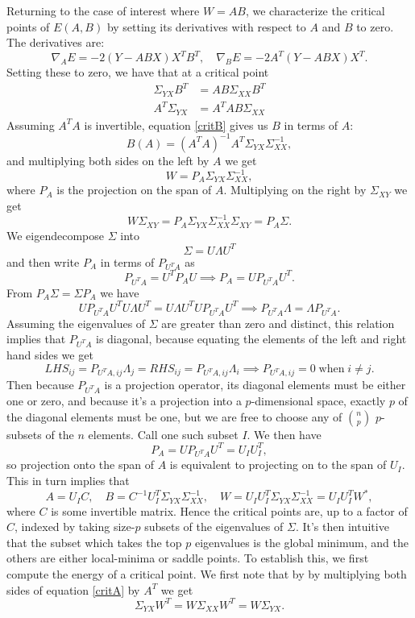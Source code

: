 \documentclass[11pt]{article}
\begin{document}
Returning to the case of interest where $W = AB$, we characterize the critical points of $E(A,B)$ by setting its derivatives with respect to $A$ and $B$ to zero. The derivatives are:
$$ \nabla_A E = -2 (Y - ABX)X^T B^T, \quad \nabla_B E = -2A^T(Y - ABX)X^T.$$
Setting these to zero, we have that at a critical point
\begin{align}
  \label{critA}
  \Sigma_{YX}B^T &= AB \Sigma_{XX}B^T \\
  \label{critB}
  A^T \Sigma_{YX} &= A^T A B \Sigma_{XX}
\end{align}
Assuming $A^TA$ is invertible, equation \ref{critB} gives us $B$ in terms of $A$:
$$ B(A) = (A^TA)^{-1}A^T \Sigma_{YX}\Sigma_{XX}^{-1},$$
and multiplying both sides on the left by $A$ we get
$$ W = P_A \Sigma_{YX}\Sigma_{XX}^{-1},$$
where $P_A$ is the projection on the span of $A$. Multiplying on the right by $\Sigma_{XY}$ we get
$$ W\Sigma_{XY} = P_A \Sigma_{YX}\Sigma_{XX}^{-1}\Sigma_{XY} = P_A \Sigma.$$
We eigendecompose $\Sigma$ into
$$ \Sigma = U \Lambda U^T $$
and then write $P_A$ in terms of $P_{U^T A}$ as
$$ P_{U^TA} = U^T P_A U \implies P_A = U P_{U^T A} U^T.$$
From $P_A \Sigma = \Sigma P_A$ we have
$$ U P_{U^T A} U^T U \Lambda U^T = U \Lambda U^TU P_{U^T A} U^T \implies P_{U^TA} \Lambda = \Lambda P_{U^TA}.$$
Assuming the eigenvalues of $\Sigma$ are greater than zero and distinct, this relation implies that $P_{U^T A}$ is diagonal, because equating the elements of the left and right hand sides we get
$$ LHS_{ij} =  P_{U^T A,ij} \Lambda_j = RHS_{ij} =  P_{U^T A,ij} \Lambda_i \implies P_{U^T A,ij} = 0\; \text{when} \; i \neq j.$$
Then because $P_{U^TA}$ is a projection operator, its diagonal elements must be either one or zero, and because it's a projection into a $p$-dimensional space, exactly $p$ of the diagonal elements must be one, but we are free to choose any of  ${n \choose p}$ $p$-subsets of the $n$ elements. Call one such subset $I$. We then have
$$ P_A = U P_{U^TA} U^T = U_I U_I^T,$$
so projection onto the span of $A$ is equivalent to projecting on to the span of $U_I$. This in turn implies that
$$A = U_I C, \quad B = C^{-1}U_I^T \Sigma_{YX}\Sigma_{XX}^{-1}, \quad W = U_I U_I^T \Sigma_{YX} \Sigma_{XX}^{-1} = U_I U_I^T W^*,$$ where $C$ is some invertible matrix. Hence the critical points are, up to a factor of $C$, indexed by taking size-$p$ subsets of the eigenvalues of $\Sigma$. It's then intuitive that the subset which takes the top $p$ eigenvalues is the global minimum, and the others are either local-minima or saddle points. To establish this, we first compute the energy of a critical point. We first note that by by multiplying both sides of equation \ref{critA} by $A^T$ we get $$\Sigma_{YX} W^T = W\Sigma_{XX}W^T = W \Sigma_{YX}.$$
\end{document}
